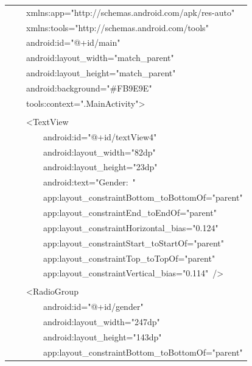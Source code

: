 \documentclass[a4paper,12pt]{article}
\begin{document}
\begin{longtable}{|p{}|}
{\ttfamily\small \ \ \ \ xmlns:app="http://schemas.android.com/apk/res-auto"} \\
{\ttfamily\small \ \ \ \ xmlns:tools="http://schemas.android.com/tools"} \\
{\ttfamily\small \ \ \ \ android:id="@+id/main"} \\
{\ttfamily\small \ \ \ \ android:layout\_width="match\_parent"} \\
{\ttfamily\small \ \ \ \ android:layout\_height="match\_parent"} \\
{\ttfamily\small \ \ \ \ android:background="\#FB9E9E"} \\
{\ttfamily\small \ \ \ \ tools:context=".MainActivity"\textgreater{}} \\
\strut \\
{\ttfamily\small \ \ \ \ \textless{}TextView} \\
{\ttfamily\small \ \ \ \ \ \ \ \ android:id="@+id/textView4"} \\
{\ttfamily\small \ \ \ \ \ \ \ \ android:layout\_width="82dp"} \\
{\ttfamily\small \ \ \ \ \ \ \ \ android:layout\_height="23dp"} \\
{\ttfamily\small \ \ \ \ \ \ \ \ android:text="Gender:\ "} \\
{\ttfamily\small \ \ \ \ \ \ \ \ app:layout\_constraintBottom\_toBottomOf="parent"} \\
{\ttfamily\small \ \ \ \ \ \ \ \ app:layout\_constraintEnd\_toEndOf="parent"} \\
{\ttfamily\small \ \ \ \ \ \ \ \ app:layout\_constraintHorizontal\_bias="0.124"} \\
{\ttfamily\small \ \ \ \ \ \ \ \ app:layout\_constraintStart\_toStartOf="parent"} \\
{\ttfamily\small \ \ \ \ \ \ \ \ app:layout\_constraintTop\_toTopOf="parent"} \\
{\ttfamily\small \ \ \ \ \ \ \ \ app:layout\_constraintVertical\_bias="0.114"\ /\textgreater{}} \\
\strut \\
{\ttfamily\small \ \ \ \ \textless{}RadioGroup} \\
{\ttfamily\small \ \ \ \ \ \ \ \ android:id="@+id/gender"} \\
{\ttfamily\small \ \ \ \ \ \ \ \ android:layout\_width="247dp"} \\
{\ttfamily\small \ \ \ \ \ \ \ \ android:layout\_height="143dp"} \\
{\ttfamily\small \ \ \ \ \ \ \ \ app:layout\_constraintBottom\_toBottomOf="parent"} \\

\end{longtable}
\end{document}
